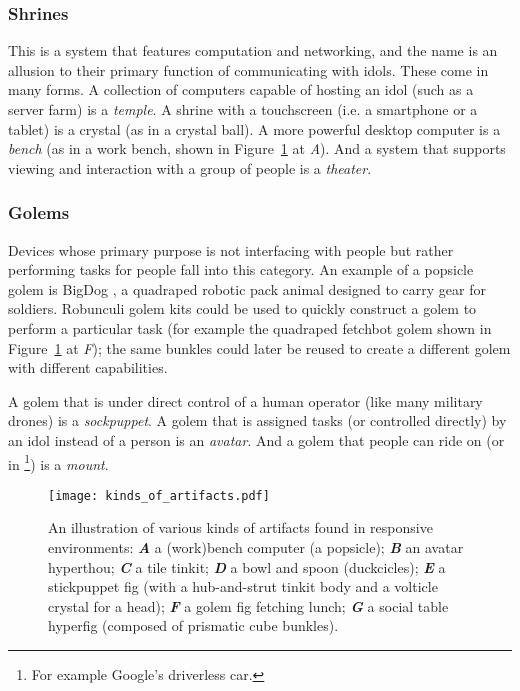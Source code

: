 \subsubsection{Shrines}
This is a system that features computation and networking, and the name is an allusion to their primary function of communicating with idols. 
These come in many forms. A collection of computers capable of hosting an idol (such as a server farm) is a \emph{temple}. 
A shrine with a touchscreen (i.e. a smartphone or a tablet) is a crystal (as in a crystal ball). 
A more powerful desktop computer is a \emph{bench} (as in a work bench, shown in Figure~\ref{fig:kinds_of_artifacts} at \emph{A}). 
And a system that supports viewing and interaction with a group of people is a \emph{theater}.

\subsubsection{Golems}
Devices whose primary purpose is not interfacing with people but rather performing tasks for people fall into this category. 
An example of a popsicle golem is BigDog \citep{bigdog}, a quadraped robotic pack animal designed to carry gear for soldiers. 
Robunculi golem kits could be used to quickly construct a golem to perform a particular task (for example the quadraped fetchbot golem shown in Figure~\ref{fig:kinds_of_artifacts} at \emph{F}); the same bunkles could later be reused to create a different golem with different capabilities. 

A golem that is under direct control of a human operator (like many military drones) is a \emph{sockpuppet}. A golem that is assigned tasks (or controlled directly) by an idol instead of a person is an \emph{avatar}. And a golem that people can ride on (or in%
\footnote{For example Google's driverless car.})
is a \emph{mount}.

\begin{figure}[]
  \centering
    \texttt{[image: kinds\_of\_artifacts.pdf]}
  \caption{An illustration of various kinds of artifacts found in responsive environments: \textbf{\emph{A}} a (work)bench computer (a popsicle); \textbf{\emph{B}} an avatar hyperthou; \textbf{\emph{C}} a tile tinkit; \textbf{\emph{D}} a bowl and spoon (duckcicles); \textbf{\emph{E}} a stickpuppet fig (with a hub-and-strut tinkit body and a volticle crystal for a head); \textbf{\emph{F}} a golem fig fetching lunch; \textbf{\emph{G}} a social table hyperfig (composed of prismatic cube bunkles).}
  \label{fig:kinds_of_artifacts}
\end{figure}

